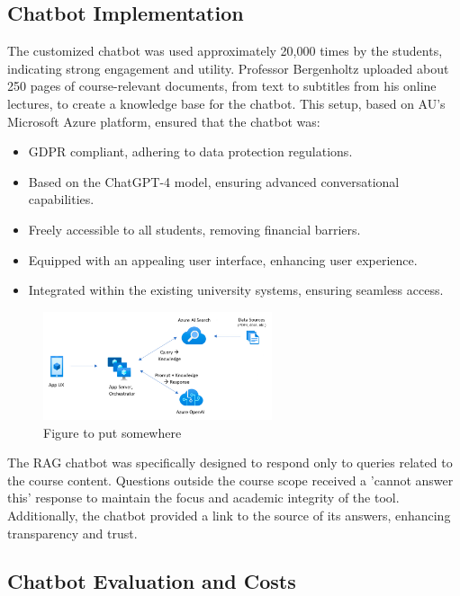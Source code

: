 \subsection*{Chatbot Implementation}

The customized chatbot was used approximately 20,000 times by the students, indicating strong engagement and utility. Professor Bergenholtz uploaded about 250 pages of course-relevant documents, from text to subtitles from his online lectures, to create a knowledge base for the chatbot. This setup, based on AU's Microsoft Azure platform, ensured that the chatbot was:

\begin{itemize}
    \item GDPR compliant, adhering to data protection regulations.
    \item Based on the ChatGPT-4 model, ensuring advanced conversational capabilities.
    \item Freely accessible to all students, removing financial barriers.
    \item Equipped with an appealing user interface, enhancing user experience.
    \item Integrated within the existing university systems, ensuring seamless access.
\end{itemize}
\begin{figure}[H]
    \centering
    \includegraphics[width=0.6\textwidth]{figs/appcomponents.png}
    \caption{Figure to put somewhere}
    \label{fig:CLAI_Poster_Competition}
\end{figure}

The RAG chatbot was specifically designed to respond only to queries related to the course content. Questions outside the course scope received a 'cannot answer this' response to maintain the focus and academic integrity of the tool. Additionally, the chatbot provided a link to the source of its answers, enhancing transparency and trust.

\subsection*{Chatbot Evaluation and Costs}

